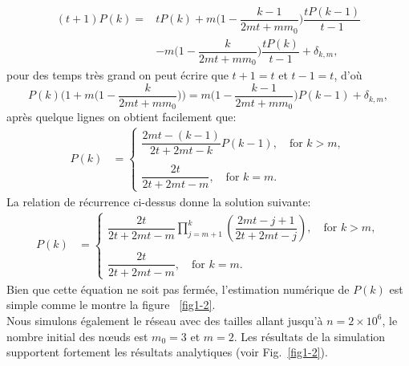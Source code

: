   \begin{equation}
  \begin{aligned}
  (t+1)P(k)= &tP(k)+m\big(1-\dfrac{k-1}{2mt+mm_0}\big)\dfrac{tP(k-1)}{t-1}\\
  &-m\big(1-\dfrac{k}{2mt+mm_0}\big)\dfrac{tP(k)}{t-1} +\delta_{k,m},
  \end{aligned}
  \end{equation}
pour des temps très grand on peut écrire que $t+1=t$ et $t-1=t$, d'où
 \begin{equation}
 P(k)\big(1+m\big(1-\dfrac{k}{2mt+mm_0}\big)\big)=m\big(1-\dfrac{k-1}{2mt+mm_0}\big)P(k-1) +\delta_{k,m},
 \end{equation}
 après quelque lignes on obtient facilement que:
\begin{align}
P(k)&= 
\begin{cases}
\dfrac{2mt - (k-1)}{2t + 2mt - k}P(k-1), \quad \textrm{for }  k>m,\\
\\
\dfrac{2t}{2t + 2mt - m}, \quad\textrm{for }  k=m.
\end{cases}
\end{align}
La relation de récurrence ci-dessus donne la solution suivante:
\begin{align}
P(k)&= 
\begin{cases}
\dfrac{2t}{2t + 2mt - m}\prod^k_{j=m+1}\left( \dfrac{2mt -j + 1}{2t + 2mt - j}\right), \quad \textrm{for }  k>m,\\
\\
\dfrac{2t}{2t + 2mt - m}, \quad\textrm{for }  k=m.
\end{cases}
\label{eq4-2}
\end{align}
Bien que cette équation ne soit pas fermée, l'estimation numérique de $ P (k) $ est simple comme le montre la figure ~\ref{fig1-2}. \\
Nous simulons également le réseau avec des tailles allant jusqu'à $n=2\times10^6$, le nombre initial des nœuds est $m_0=3$ et $m=2$. 
Les résultats de la simulation supportent fortement les résultats analytiques (voir Fig.~\ref{fig1-2}). 

